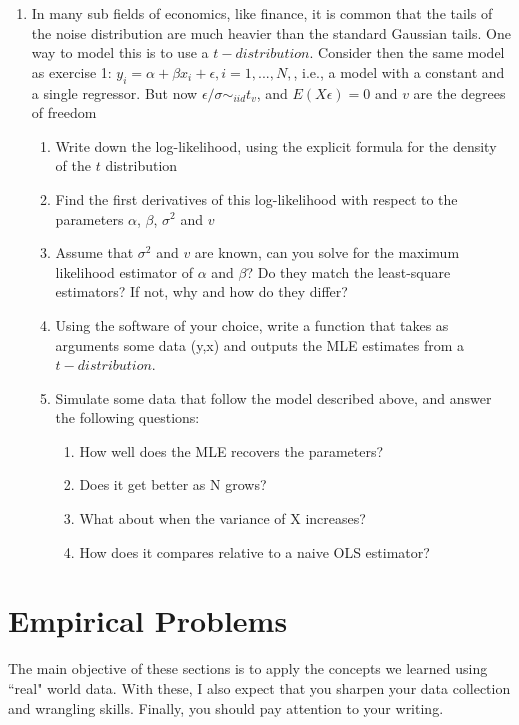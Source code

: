 \documentclass[12pt,onecolumn]{article}
\begin{document}
\begin{enumerate}
\item In many sub fields of economics, like finance, it is common that the tails of the noise distribution are much heavier than the standard Gaussian tails. One way to model this is to use a $t-distribution$. Consider then the same  model as exercise 1: $y_i = \alpha +\beta x_i +\epsilon, i=1,...,N,$, i.e., a model with a constant and a single regressor. But now $\epsilon / \sigma \sim_{iid} t_v$, and $E(X\epsilon)=0$ and $v$ are the degrees of freedom
  \begin{enumerate}
    \item Write down the log-likelihood, using the explicit formula for the density of the $t$ distribution
    \item Find the first derivatives of this log-likelihood with respect to the parameters $\alpha$, $\beta$, $\sigma^2$ and $v$
    \item Assume that $\sigma^2$ and $v$ are known, can you solve for the maximum likelihood estimator of $\alpha$ and $\beta$? Do they match the least-square estimators? If not, why and how do they differ?
    \item Using the software of your choice, write a function that takes as arguments some data (y,x) and outputs the MLE estimates from a $t-distribution$.
    \item Simulate some data that follow the model described above, and answer the following questions:
    \begin{enumerate}
      \item How well does the MLE recovers the parameters?
      \item Does it get better as N grows?
      \item What about when the variance of X increases?
      \item How does it compares relative to a naive OLS estimator?
    
    \end{enumerate}
  \end{enumerate}  

  

\end{enumerate}

\pagebreak

\section{Empirical Problems}

The main objective of these sections is to apply the concepts we learned using ``real" world data. With these, I also expect that you sharpen your data collection and wrangling skills. Finally, you should pay attention to your writing.
\end{document}
